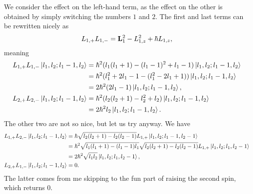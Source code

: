 We consider the effect on the left-hand term, as the effect on the other is obtained by simply switching the numbers $1$ and $2$. The first and last terms can be rewritten nicely as
\begin{align*}
	L_{1, +}L_{1, -} = \vb{L}_{1}^{2} - L_{1, z}^{2} + \hbar L_{1, z},
\end{align*}
meaning
\begin{align*}
	L_{1, +}L_{1, -}\ket{l_{1}, l_{2}; l_{1} - 1, l_{2}} &= \hbar^{2}(l_{1}(l_{1} + 1) - (l_{1} - 1)^{2} + l_{1} - 1)\ket{l_{1}, l_{2}; l_{1} - 1, l_{2}} \\
	                                                     &= \hbar^{2}(l_{1}^{2} + 2l_{1} - 1 - (l_{1}^{2} - 2l_{1} + 1))\ket{l_{1}, l_{2}; l_{1} - 1, l_{2}} \\
	                                                     &= 2\hbar^{2}(2l_{1} - 1)\ket{l_{1}, l_{2}; l_{1} - 1, l_{2}}, \\
	L_{2, +}L_{2, -}\ket{l_{1}, l_{2}; l_{1} - 1, l_{2}} &= \hbar^{2}(l_{2}(l_{2} + 1) - l_{2}^{2} + l_{2})\ket{l_{1}, l_{2}; l_{1} - 1, l_{2}} \\
	                                                     &= 2\hbar^{2}l_{2}\ket{l_{1}, l_{2}; l_{1} - 1, l_{2}}.
\end{align*}
The other two are not so nice, but let us try anyway. We have
\begin{align*}
	L_{1, +}L_{2, -}\ket{l_{1}, l_{2}; l_{1} - 1, l_{2}} &= \hbar\sqrt{l_{2}(l_{2} + 1) - l_{2}(l_{2} - 1)}L_{1, +}\ket{l_{1}, l_{2}; l_{1} - 1, l_{2} - 1} \\
	                                                     &= \hbar^{2}\sqrt{l_{1}(l_{1} + 1) - (l_{1} - 1)l_{1}}\sqrt{l_{2}(l_{2} + 1) - l_{2}(l_{2} - 1)}L_{1, +}\ket{l_{1}, l_{2}; l_{1}, l_{2} - 1} \\
	                                                     &= 2\hbar^{2}\sqrt{l_{1}l_{2}}\ket{l_{1}, l_{2}; l_{1}, l_{2} - 1}, \\
	L_{2, +}L_{1, -}\ket{l_{1}, l_{2}; l_{1} - 1, l_{2}} &= 0.
\end{align*}
The latter comes from me skipping to the fun part of raising the second spin, which returns $0$.

